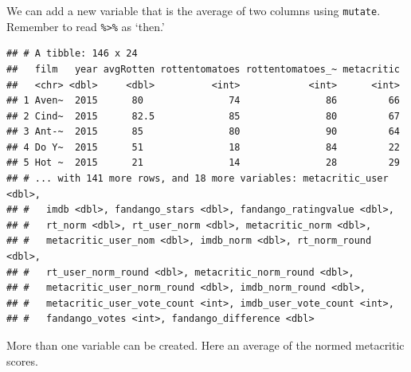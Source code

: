 \documentclass[
]{book}
\newenvironment{Shaded}{\begin{snugshade}}{\end{snugshade}}
\newcommand{\DataTypeTok}[1]{\textcolor[rgb]{0.13,0.29,0.53}{#1}}
\newcommand{\DecValTok}[1]{\textcolor[rgb]{0.00,0.00,0.81}{#1}}
\newcommand{\KeywordTok}[1]{\textcolor[rgb]{0.13,0.29,0.53}{\textbf{#1}}}
\newcommand{\NormalTok}[1]{#1}
\newcommand{\OperatorTok}[1]{\textcolor[rgb]{0.81,0.36,0.00}{\textbf{#1}}}
\newcommand{\StringTok}[1]{\textcolor[rgb]{0.31,0.60,0.02}{#1}}
\theoremstyle{definition}
\theoremstyle{definition}
\theoremstyle{definition}
\theoremstyle{remark}
\begin{document}
We can add a new variable that is the average of two columns using \texttt{mutate}. Remember to read \texttt{\%\textgreater{}\%} as `then.'

\begin{Shaded}
\end{Shaded}

\begin{verbatim}
## # A tibble: 146 x 24
##   film   year avgRotten rottentomatoes rottentomatoes_~ metacritic
##   <chr> <dbl>     <dbl>          <int>            <int>      <int>
## 1 Aven~  2015      80               74               86         66
## 2 Cind~  2015      82.5             85               80         67
## 3 Ant-~  2015      85               80               90         64
## 4 Do Y~  2015      51               18               84         22
## 5 Hot ~  2015      21               14               28         29
## # ... with 141 more rows, and 18 more variables: metacritic_user <dbl>,
## #   imdb <dbl>, fandango_stars <dbl>, fandango_ratingvalue <dbl>,
## #   rt_norm <dbl>, rt_user_norm <dbl>, metacritic_norm <dbl>,
## #   metacritic_user_nom <dbl>, imdb_norm <dbl>, rt_norm_round <dbl>,
## #   rt_user_norm_round <dbl>, metacritic_norm_round <dbl>,
## #   metacritic_user_norm_round <dbl>, imdb_norm_round <dbl>,
## #   metacritic_user_vote_count <int>, imdb_user_vote_count <int>,
## #   fandango_votes <int>, fandango_difference <dbl>
\end{verbatim}

More than one variable can be created. Here an average of the normed metacritic scores.

\begin{Shaded}
\end{Shaded}
\end{document}
